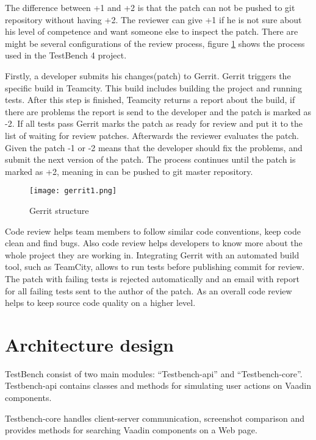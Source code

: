   The difference between +1 and +2 is that the patch can not be pushed to git
  repository without having +2. The reviewer can give +1 if he is not sure about 
  his level of competence  and want someone else to inspect the patch. 
  There are might be several configurations of the review process,
  figure \ref{fig:gerritTestbench} shows the process used in the
  TestBench 4 project.

  Firstly, a developer submits his changes(patch) to Gerrit. Gerrit triggers the
  specific build in Teamcity. This build includes building the project and
  running tests. After this step is finished, Teamcity returns a report about the build,
  if there are problems the report is send to the developer and the patch is marked as -2. If all
  tests pass Gerrit marks the patch as ready for review and put it to the list
  of waiting for review patches.
  Afterwards the reviewer evaluates the patch. Given the patch -1 or -2 means
  that the developer should fix the problems, and submit the next version of the patch. 
  The process continues until the patch is marked as +2,
    meaning in can be pushed to git master repository.
    \begin{figure}
    \centering
      \texttt{[image: gerrit1.png]}
      \caption{Gerrit structure}
      \label{fig:gerritTestbench}
    \end{figure}
    
  Code review helps team members to follow similar code conventions, 
  keep code clean and find bugs. Also code review helps developers to know more about 
  the whole project they are working in. Integrating Gerrit with an automated build tool, 
  such as TeamCity, allows to run tests before publishing commit for review. 
  The patch with failing tests is rejected automatically and an email with report
   for all failing tests sent to the author of the patch. 
   As an overall code review helps to keep source code quality on a higher level.

  \section{Architecture design}
   
  TestBench consist of two main modules: ``Testbench-api'' and
  ``Testbench-core''. Testbench-api contains classes and methods for
  simulating user actions on Vaadin components.
  
  Testbench-core handles client-server communication, screenshot comparison and
   provides methods for searching Vaadin components on a Web page.
   
